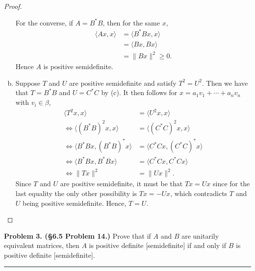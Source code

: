 \documentclass[leqno]{article}
\theoremstyle{nonumberplain}
\newtheorem{proof}{Proof}
\begin{document}
\begin{proof}
\begin{enumerate}[(a)]
For the converse, if $A=B^*B$, then for the same $x$, 
\begin{align*}
\langle Ax,x \rangle &= \langle B^*Bx,x\rangle \\
& = \langle Bx,Bx \rangle\\
&= \|Bx\|^2 \geq 0.
\end{align*}
Hence $A$ is positive semidefinite.

\item Suppose $T$ and $U$ are positive semidefinite and satisfy $T^2=U^2$.  Then we have that $T=B^*B$ and $U=C^*C$ by (c). It then follows for $x=a_1 v_1+ \cdots + a_n v_n$ with $v_i \in \beta$,
\begin{align*}
\langle T^2 x,x \rangle &= \langle U^2 x, x \rangle \\
\iff\langle (B^*B)^2x,x\rangle &= \langle (C^*C)^2x,x\rangle\\
\iff\langle B^*Bx,(B^*B)^*x \rangle &= \langle C^*Cx,(C^*C)^*x\rangle\\
\iff\langle B^*Bx,B^*Bx\rangle &= \langle C^*Cx,C^*Cx \rangle\\
\iff \|Tx\|^2&=\|Ux\|^2.
\end{align*}
Since $T$ and $U$ are positive semidefinite, it must be that $Tx=Ux$ since for the last equality the only other possibility is $Tx=-Ux$, which contradicts $T$ and $U$ being positive semidefinite. Hence, $T=U$.
\end{enumerate}

\end{proof}



\pagebreak




\noindent\textbf{Problem 3. (\S 6.5  Problem 14.)} Prove that if $A$ and $B$ are unitarily equivalent matrices, then $A$ is positive definite [semidefinite] if and only if $B$ is positive definite [semidefinite].

\noindent\rule[0.5ex]{\linewidth}{1pt}
\end{document}
